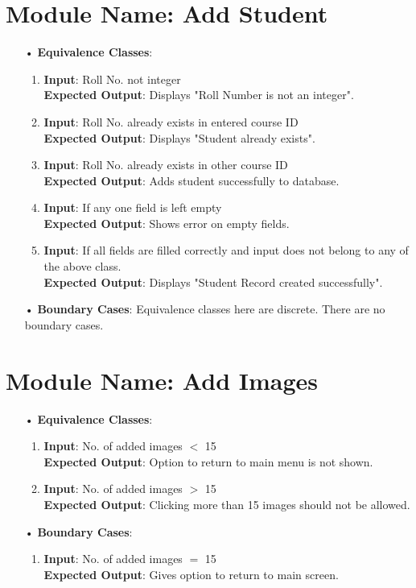 \documentclass{scrreprt}
\begin{document}
\section{Module Name: Add Student}
\begin{itemize}
\item[•]\textbf{Equivalence Classes}:
\begin{enumerate}
\item \textbf{Input}: Roll No. not integer \\
\textbf{Expected Output}: Displays "Roll Number is not an integer".
\item \textbf{Input}:  Roll No. already exists in entered course ID\\
\textbf{Expected Output}: Displays "Student already exists".
\item \textbf{Input}: Roll No. already exists in other course ID\\
\textbf{Expected Output}: Adds student successfully to database.
\item \textbf{Input}: If any one field is left empty\\
\textbf{Expected Output}: Shows error on empty fields.
\item \textbf{Input}: If all fields are filled correctly and input does not belong to any of the above class.\\
\textbf{Expected Output}: Displays "Student Record created successfully".
\end{enumerate}
\item[•]\textbf{Boundary Cases}: Equivalence classes here are discrete. There are no boundary cases.
\end{itemize}

\section{Module Name: Add Images}
\begin{itemize}
\item[•]\textbf{Equivalence Classes}:
\begin{enumerate}
\item \textbf{Input}: No. of added images $<$ 15 \\
\textbf{Expected Output}: Option to return to main menu is not shown.
\item \textbf{Input}:  No. of added images $>$ 15\\
\textbf{Expected Output}: Clicking more than 15 images should not be allowed.
\end{enumerate}
\item[•]\textbf{Boundary Cases}:
\begin{enumerate}
\item \textbf{Input}: No. of added images $=$ 15 \\
\textbf{Expected Output}: Gives option to return to main screen.
\end{enumerate}
\end{itemize}
\end{document}

